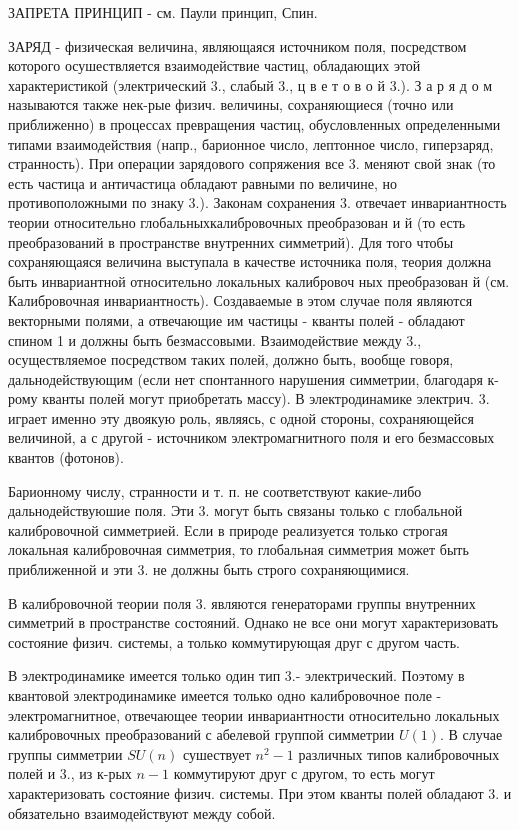 \documentclass[10pt]{article}
\begin{document}
ЗАПРЕТА ПРИНЦИП - см. Паули принцип, Спин.



ЗАРЯД - физическая величина, являющаяся источником поля, посредством которого осушествляется взаимодействие частиц, обладающих этой характеристикой (электрический 3., слабый 3., ц в е т о в о й 3.). З а р я д о м называются также нек-рые физич. величины, сохраняющиеся (точно или приближенно) в процессах превращения частиц, обусловленных определенными типами взаимодействия (напр., барионное число, лептонное число, гиперзаряд, странность). При операции зарядового сопряжения все 3. меняют свой знак (то есть частица и античастица обладают равными по величине, но противоположными по знаку 3.). Законам сохранения 3. отвечает инвариантность теории относительно глобальныхкалибровочных преобразован и й (то есть преобразований в пространстве внутренних симметрий). Для того чтобы сохраняющаяся величина выступала в качестве источника поля, теория должна быть инвариантной относительно локальных калибровоч ных преобразован й (см. Калибровочная инвариантность). Создаваемые в этом случае поля являются векторными полями, а отвечающие им частицы - кванты полей - обладают спином 1 и должны быть безмассовыми. Взаимодействие между 3., осуществляемое посредством таких полей, должно быть, вообще говоря, дальнодействующим (если нет спонтанного нарушения симметрии, благодаря к-рому кванты полей могут приобретать массу). В электродинамике электрич. 3. играет именно эту двоякую роль, являясь, с одной стороны, сохраняющейся величиной, а с другой - источником электромагнитного поля и его безмассовых квантов (фотонов).



Барионному числу, странности и т. п. не соответствуют какие-либо дальнодействуюшие поля. Эти 3. могут быть связаны только с глобальной калибровочной симметрией. Если в природе реализуется только строгая локальная калибровочная симметрия, то глобальная симметрия может быть приближенной и эти 3. не должны быть строго сохраняющимися.



В калибровочной теории поля 3. являются генераторами группы внутренних симметрий в пространстве состояний. Однако не все они могут характеризовать состояние физич. системы, а только коммутирующая друг с другом часть.



В электродинамике имеется только один тип 3.- электрический. Поэтому в квантовой электродинамике имеется только одно калибровочное поле - электромагнитное, отвечающее теории инвариантности относительно локальных калибровочных преобразований с абелевой группой симметрии $U(1)$. В случае группы симметрии $S U(n)$ сушествует $n^{2}-1$ различных типов калибровочных полей и 3., из к-рых $n-1$ коммутируют друг с другом, то есть могут характеризовать состояние физич. системы. При этом кванты полей обладают 3. и обязательно взаимодействуют между собой.
\end{document}
